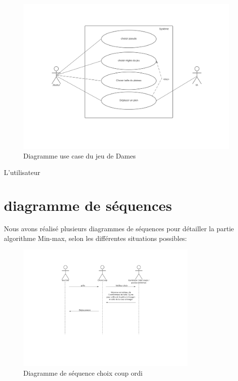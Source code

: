 \documentclass[12,french]{report}
\begin{document}
\begin{figure}[H]
	\center
	\includegraphics[width=1\textwidth]{./Images/Diagramme_use_case}
	\caption{Diagramme use case du jeu de Dames}
\end{figure}\vspace{0.2cm}

L'utilisateur

\section{diagramme de séquences}

Nous avons réalisé plusieurs diagrammes de séquences pour détailler
la partie algorithme Min-max, selon les différentes situations possibles:

\begin{figure}[H]
	\center
	\includegraphics[width=0.8\textwidth]{./Images/Diagramme_de_sequence1}
	\caption{Diagramme de séquence choix coup ordi}
\end{figure}\vspace{0.2cm}
\end{document}
